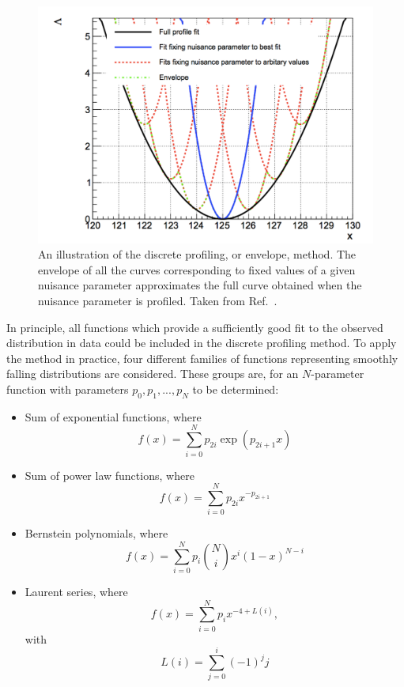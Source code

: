 \begin{figure}[hptb]
\centering
\includegraphics[width=\textwidth]{Figures/SigBkg/EnvelopeIllustration.pdf}
\caption{
  An illustration of the discrete profiling, or envelope, method.
  The envelope of all the curves corresponding to fixed values of a given nuisance parameter
  approximates the full curve obtained when the nuisance parameter is profiled.
  Taken from Ref.~\cite{Envelope}.
}
\label{fig:sigbkg_envelope}
\end{figure}

In principle, all functions which provide a sufficiently good fit to the observed \mgg distribution
in data could be included in the discrete profiling method.
To apply the method in practice, 
four different families of functions representing smoothly falling distributions are considered.
These groups are, for an $N$-parameter function with parameters $p_0, p_1, ..., p_N$ to be determined: 
\begin{itemize}
\item Sum of exponential functions, where
\begin{equation*}
f\left(x\right) = \sum_{i=0}^{N} p_{2i}\exp{\left(p_{2i+1}x\right)}
\end{equation*}
\item Sum of power law functions, where
\begin{equation*}
f\left(x\right) = \sum_{i=0}^{N} p_{2i}x^{-p_{2i+1}}
\end{equation*}
\item Bernstein polynomials, where
\begin{equation*}
f\left(x\right) = \sum_{i=0}^{N} p_{i}\binom{N}{i}x^{i}\left(1-x\right)^{N-i}
\end{equation*}
\item Laurent series, where
\begin{equation*}
f\left(x\right) = \sum_{i=0}^{N} p_{i}x^{-4 + L\left(i\right)},
\end{equation*}
with
\begin{equation*}
L\left(i\right) = \sum_{j=0}^{i}(-1)^j j
\end{equation*}
\end{itemize}

